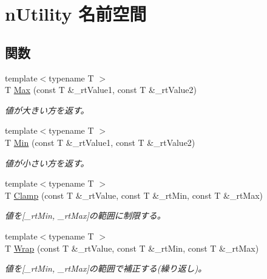 \hypertarget{namespacen_utility}{}\section{n\+Utility 名前空間}
\label{namespacen_utility}
\subsection*{関数}
\begin{DoxyCompactItemize}
\item 
{\footnotesize template$<$typename T $>$ }\\T \hyperlink{namespacen_utility_ab6231a9f141e2da5e9230649d995c60b}{Max} (const T \&\+\_\+rt\+Value1, const T \&\+\_\+rt\+Value2)
\begin{DoxyCompactList}\small\item\em 値が大きい方を返す。 \end{DoxyCompactList}\item 
{\footnotesize template$<$typename T $>$ }\\T \hyperlink{namespacen_utility_a29a16fe5a81fc70efbf7c7301a903613}{Min} (const T \&\+\_\+rt\+Value1, const T \&\+\_\+rt\+Value2)
\begin{DoxyCompactList}\small\item\em 値が小さい方を返す。 \end{DoxyCompactList}\item 
{\footnotesize template$<$typename T $>$ }\\T \hyperlink{namespacen_utility_aa149b099050c2da27c676d9029f9a5b2}{Clamp} (const T \&\+\_\+rt\+Value, const T \&\+\_\+rt\+Min, const T \&\+\_\+rt\+Max)
\begin{DoxyCompactList}\small\item\em 値を\mbox{[}\+\_\+rt\+Min, \+\_\+rt\+Max\mbox{]}の範囲に制限する。 \end{DoxyCompactList}\item 
{\footnotesize template$<$typename T $>$ }\\T \hyperlink{namespacen_utility_a7083a9c96d62f05173d2755957fe7f81}{Wrap} (const T \&\+\_\+rt\+Value, const T \&\+\_\+rt\+Min, const T \&\+\_\+rt\+Max)
\begin{DoxyCompactList}\small\item\em 値を\mbox{[}\+\_\+rt\+Min, \+\_\+rt\+Max\mbox{]}の範囲で補正する(繰り返し)。 \end{DoxyCompactList}\end{DoxyCompactItemize}


